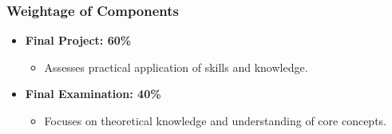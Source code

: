 \documentclass[aspectratio=169]{beamer}
\begin{document}
\begin{frame}[fragile]
    \frametitle{Weightage of Components}
    \begin{itemize}
        \item \textbf{Final Project: 60\%}
            \begin{itemize}
                \item Assesses practical application of skills and knowledge.
            \end{itemize}
        \item \textbf{Final Examination: 40\%}
            \begin{itemize}
                \item Focuses on theoretical knowledge and understanding of core concepts.
            \end{itemize}
    \end{itemize}
\end{frame}
\end{document}
